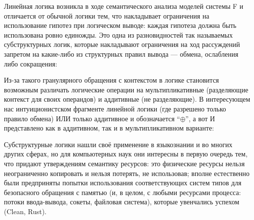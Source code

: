 \documentclass[12pt]{article}
\begin{document}
Линейная логика возникла в ходе семантического анализа моделей системы F и
отличается от обычной логики тем, что накладывает ограничения на использование
гипотез при логическом выводе: каждая гипотеза должна быть использована ровно
единожды. Это одна из разновидностей так называемых субструктурных логик,
которые накладывают ограничения на ход рассуждений запретом на какие-либо из
структурных правил вывода --- обмена, ослабления либо сокращения:

Из-за такого гранулярного обращения с контекстом в логике становится возможным
различать логические операции на мультипликативные (разделяющие контекст для
своих операндов) и аддитивные (не разделяющие). В интересующем нас
интуиционистском фрагменте линейной логики (где разрешено только правило обмена)
ИЛИ только аддитивное и обозначается ``$\oplus$'', а вот И представлено как в
аддитивном, так и в мультипликативном варианте:

Субструктурные логики нашли своё применение в языкознании и во многих других
сферах, но для компьютерных наук они интересны в первую очередь тем, что придают
утверждениям семантику ресурсов: это физические ресурсы нельзя неограниченно
копировать и нельзя потерять, не использовав; вполне естественно были
предприняты попытки использования соответствующих систем типов для безопасного
обращения с памятью (и, в целом, с любыми ресурсами процесса: потоки
ввода-вывода, сокеты, файловая система), которые увенчались успехом (Clean,
Rust).
\end{document}
